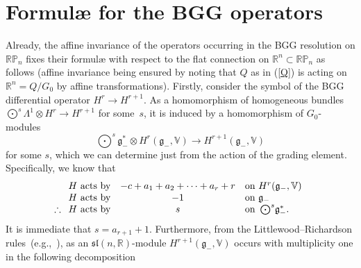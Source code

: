 \section{Formul{\ae} for the BGG operators}
Already, the af\/f\/ine invariance of the operators occurring in the BGG resolution
on ${\mathbb{RP}}_n$ f\/ixes their formul{\ae} with respect to the f\/lat
connection on ${\mathbb{R}}^n\subset{\mathbb{RP}}_n$ as follows (af\/f\/ine
invariance being ensured by noting that $Q$ as in (\ref{Q}) is acting on
${\mathbb{R}}^n=Q/G_0$ by af\/f\/ine transformations). Firstly, consider the symbol
of the BGG dif\/ferential operator $H^r\to H^{r+1}$. As a homomorphism of
homogeneous bundles $\bigodot^s\!\Lambda^1\otimes H^r\to H^{r+1}$ for
some~$s$, it is induced by a homomorphism of $G_0$-modules
\[\textstyle
\bigodot^s\!{\mathfrak{g}}_-^*\otimes H^r({\mathfrak{g}}_-,{\mathbb{V}})\to
H^{r+1}({\mathfrak{g}}_-,{\mathbb{V}})\]
for some $s$, which we can determine just from the action of the grading
element. Specif\/ically, we know that
\[\begin{array}{@{}rcl}
H\mbox{ acts by}&-c+a_1+a_2+\cdots+a_r+r&
\mbox{on }H^r({\mathfrak{g}}_-,{\mathbb{V}})\\
H\mbox{ acts by}&-1&
\mbox{on }{\mathfrak{g}}_-\\
\therefore\enskip H\mbox{ acts by}&s&
\mbox{on }\bigodot^s\!{\mathfrak{g}}_-^*.
\end{array}\]
It is immediate that $s=a_{r+1}+1$. Furthermore, from the
Littlewood--Richardson rules~(e.g.,~\cite{fh}), as an
${\mathfrak{sl}}(n,{\mathbb{R}})$-module
$H^{r+1}({\mathfrak{g}}_-,{\mathbb{V}})$ occurs with multiplicity one in the
following decomposition
